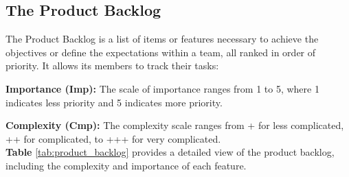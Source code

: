 \subsection{The Product Backlog}

The Product Backlog is a list of items or features necessary to achieve the objectives or define the expectations within a team, all ranked in order of priority. It allows its members to track their tasks:

\textbf{Importance (Imp):}
The scale of importance ranges from 1 to 5, where 1 indicates less priority and 5 indicates more priority.

\textbf{Complexity (Cmp):}
The complexity scale ranges from + for less complicated, ++ for complicated, to +++ for very complicated. \\
\textbf{Table} \ref{tab:product_backlog} provides a detailed view of the product backlog, including the complexity and importance of each feature.

